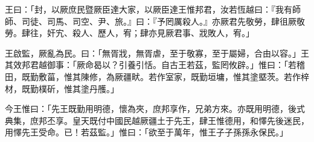 
\begin{pinyinscope}
王曰：「封，以厥庶民暨厥臣達大家，以厥臣達王惟邦君，汝若恆越曰：『我有師師、司徒、司馬、司空、尹、旅。』曰：『予罔厲殺人。』亦厥君先敬勞，肆徂厥敬勞。肆往，奸宄、殺人、歷人，宥；肆亦見厥君事、戕敗人，宥。」

王啟監，厥亂為民。曰：「無胥戕，無胥虐，至于敬寡，至于屬婦，合由以容。」王其效邦君越御事：「厥命曷以？引養引恬。自古王若茲，監罔攸辟。」惟曰：「若稽田，既勤敷菑，惟其陳修，為厥疆畎。若作室家，既勤垣墉，惟其塗塈茨。若作梓材，既勤樸斫，惟其塗丹雘。」

今王惟曰：「先王既勤用明德，懷為夾，庶邦享作，兄弟方來。亦既用明德，後式典集，庶邦丕享。皇天既付中國民越厥疆土于先王，肆王惟德用，和懌先後迷民，用懌先王受命。已！若茲監。」惟曰：「欲至于萬年，惟王子子孫孫永保民。」


\end{pinyinscope}